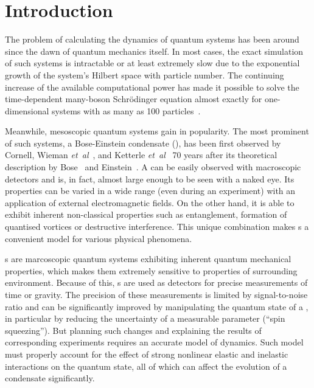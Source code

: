 \chapter{Introduction}

The problem of calculating the dynamics of quantum systems has been around since the dawn of quantum mechanics itself.
In most cases, the exact simulation of such systems is intractable or at least extremely slow due to the exponential growth of the system's Hilbert space with particle number.
The continuing increase of the available computational power has made it possible to solve the time-dependent many-boson Schr\"odinger equation almost exactly for one-dimensional systems with as many as 100 particles~\cite{Sakmann2009}.

Meanwhile, mesoscopic quantum systems gain in popularity.
The most prominent of such systems, a Bose-Einstein condensate (), has been first observed by Cornell, Wieman \textit{et~al}~\cite{Anderson1995}, and Ketterle \textit{et~al}~\cite{Davis1995} 70 years after its theoretical description by Bose~\cite{Bose1924} and Einstein~\cite{Einstein1924,Einstein1925}.
A  can be easily observed with macroscopic detectors and is, in fact, almost large enough to be seen with a naked eye.
Its properties can be varied in a wide range (even during an experiment) with an application of external electromagnetic fields.
On the other hand, it is able to exhibit inherent non-classical properties such as entanglement, formation of quantised vortices or destructive interference.
This unique combination makes s a convenient model for various physical phenomena.

s are marcoscopic quantum systems exhibiting inherent quantum mechanical properties, which makes them extremely sensitive to properties of surrounding environment.
Because of this, s are used as detectors for precise measurements of time or gravity.
The precision of these measurements is limited by signal-to-noise ratio and can be significantly improved by manipulating the quantum state of a , in particular by reducing the uncertainty of a measurable parameter (``spin squeezing'').
But planning such changes and explaining the results of corresponding experiments requires an accurate model of  dynamics.
Such model must properly account for the effect of strong nonlinear elastic and inelastic interactions on the quantum state, all of which can affect the evolution of a condensate significantly.

